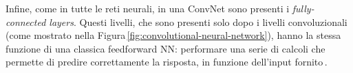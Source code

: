 Infine, come in tutte le reti neurali, in una \acs{ConvNet} sono presenti i \textit{fully-connected layers}. Questi livelli, che sono presenti solo dopo i livelli convoluzionali (come mostrato nella Figura\,\ref{fig:convolutional-neural-network}), hanno la stessa funzione di una classica feedforward \acs{NN}: performare una serie di calcoli che permette di predire correttamente la risposta, in funzione dell'input fornito\,\cite{aggarwal2018neural, o2015introduction}.



\begin{comment}
    Per non diventare matti la notazione è l'opposta di quella sul file di Machine Learnign.
    - ci sono esattamente N feature in un vettore di input, di conseguenza il vettore di pesi è di lunghezza N
    - ci sono esattamente M vettori di input nel dataset, di conseguenza la lunghezza della label è M
    - Il dataset D è composta da j colonne ed i righe
    - Ciascuna riga j rappresenta un elemento del dataset
    - Ciascuna colonna i rappresente un feature del dataset
    
    Di conseguneza D_j indica il vettore j-esimo composto esattamente da N componenti. La label y_j indica il vero valore dell'input processato
\end{comment}





